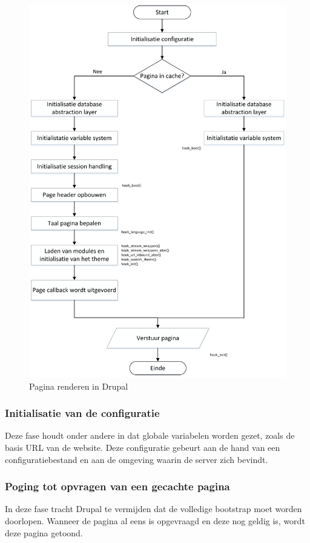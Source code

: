 \begin{figure}
\includegraphics[width=1\textwidth]{fig/drupalPageRendering}
\caption{Pagina renderen in Drupal}
\label{fig:drupalPageRendering}
\end{figure}

\subsubsection{Initialisatie van de configuratie}
Deze fase houdt onder andere in dat globale variabelen worden gezet, zoals de basis URL van de website. Deze configuratie gebeurt aan de hand van een configuratiebestand en aan de omgeving waarin de server zich bevindt.

\subsubsection{Poging tot opvragen van een gecachte pagina}
In deze fase tracht Drupal te vermijden dat de volledige bootstrap moet worden doorlopen. Wanneer de pagina al eens is opgevraagd en deze nog geldig is, wordt deze pagina getoond.

